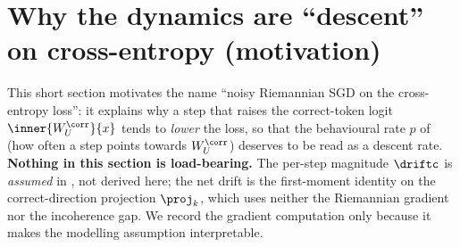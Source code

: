 \section{Why the dynamics are ``descent'' on cross-entropy (motivation)}
\label{sec:riem_gradient}

This short section motivates the name ``noisy Riemannian SGD on the
cross-entropy loss'': it explains why a step that raises the correct-token
logit $\inner{W_U^{\corr}}{x}$ tends to \emph{lower} the loss, so that the
behavioural rate $p$ of  (how often a step points towards
$W_U^{\corr}$) deserves to be read as a descent rate. \textbf{Nothing in
this section is load-bearing.} The per-step magnitude $\driftc$ is
\emph{assumed} in , not derived here; the net drift is
the first-moment identity  on the correct-direction
projection $\proj_k$, which uses neither the Riemannian gradient nor the
incoherence gap. We record the gradient computation only because it makes
the modelling assumption interpretable.

